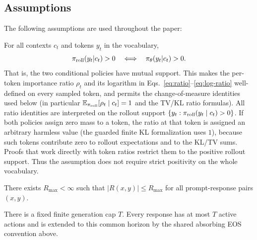 \subsection{Assumptions}
\label{sec:assumptions}

The following assumptions are used throughout the paper:

\begin{assumption}
\label{asm:support}
For all contexts $c_t$ and tokens $y_t$ in the vocabulary,
\begin{equation*}
    \pi_{\mathrm{roll}}(y_t|c_t) > 0
    \quad\Longleftrightarrow\quad
    \pi_{\theta}(y_t|c_t) > 0.
\end{equation*}
That is, the two conditional policies have mutual support. This makes the per-token importance ratio
$\rho_t$ and its logarithm in Eqs.~\eqref{eq:ratio}--\eqref{eq:log-ratio} well-defined on every sampled token, and permits the
change-of-measure identities used below (in particular $\mathbb{E}_{\pi_{\mathrm{roll}}}[\rho_t\mid c_t]=1$ and the TV/KL ratio formulas).
All ratio identities are interpreted on the rollout support
$\{y_t:\pi_{\mathrm{roll}}(y_t\mid c_t)>0\}$. If both policies assign zero mass to a token,
the ratio at that token is assigned an arbitrary harmless value (the guarded
finite KL formalization uses $1$), because such tokens contribute zero to
rollout expectations and to the KL/TV sums. Proofs that work directly with
token ratios restrict them to the positive rollout support. Thus the assumption
does not require strict positivity on the whole vocabulary.
\end{assumption}

\begin{assumption}
There exists $R_{\max} < \infty$ such that $|R(x, y)| \le R_{\max}$ for all prompt-response pairs $(x, y)$.
\end{assumption}

\begin{assumption}
\label{asm:finite-length}
There is a fixed finite generation cap $T$. Every response has at most $T$
active actions and is extended to this common horizon by the shared absorbing
EOS convention above.
\end{assumption}

